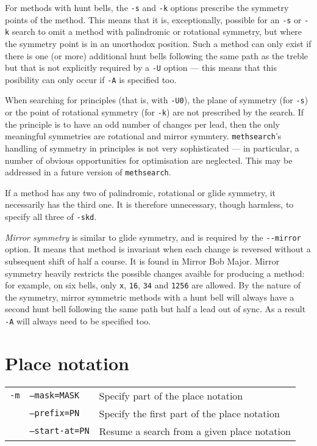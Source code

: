 \documentclass[a4paper,11pt,oneside]{book}
\makeatletter
\newcommand{\loid}[1]{\index{#1@{\hspace*{-\loptwidth}\texttt{--#1}}|ulink}}
\def\methsearch{\texttt{meth\-search}}
\makeatother
\begin{document}
For methods with hunt bells, the \verb+-s+ and \verb+-k+ options prescribe
the symmetry points of the method.  This means that it is, exceptionally, 
possible for an \verb+-s+ or \verb+-k+ search to omit a method with 
palindromic or rotational symmetry, but where the symmetry point is in
an unorthodox position.  Such a method can only exist if there is one (or 
more) additional hunt bells following the same path as the treble but that is
not explicitly required by a \verb+-U+ option --- this means that this 
posibility can only occur if \verb+-A+ is specified too.

When searching for principles (that is, with \verb+-U0+), the plane of 
symmetry (for \verb+-s+) or the point of rotational symmetry (for \verb+-k+)
are not prescribed by the search.  If the principle is to have an odd 
number of changes per lead, then the only meaningful symmetries are
rotational and mirror symmtery.  \methsearch's handling of symmetry in
principles is not very sophisticated --- in particular, a number of 
obvious opportunities for optimisation are neglected.  This may be addressed
in a future version of \methsearch.

If a method has any two of palindromic, rotational or glide symmetry,
it necessarily has the third one.  It is therefore unnecessary, though 
harmless, to specify all three of \verb+-skd+.

\textit{Mirror symmetry} 
is similar to glide symmetry, and is required
by the \verb+--mirror+ option.\loid{mirror}  
It means that method is invariant when 
each change is reversed without a subsequent shift of half a course.  It 
is found in Mirror Bob Major.  Mirror symmetry heavily restricts the 
possible changes avaible for producing a method: for example, on six bells,
only \verb+x+, \verb+16+, \verb+34+ and \verb+1256+ are allowed.
By the nature of the symmetry, mirror symmetric methods with a hunt bell
will always have a second hunt bell following the same path but half a lead
out of sync.  As a result \verb+-A+ will always need to be specified too.


\section{Place notation}\label{pn}

\begin{tabularx}{\textwidth}{llX}
\texttt{-m}&\texttt{--mask=MASK}&Specify part of the place notation\\
&\texttt{--prefix=PN}&Specify the first part of the place notation\\
&\texttt{--start-at=PN}&Resume a search from a given place notation\\
\end{tabularx}
\end{document}
